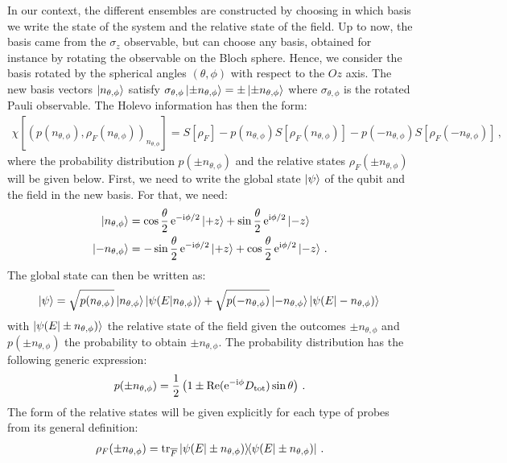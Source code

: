 In our context, the different ensembles are constructed by choosing 
in which basis we write the state of the system and the relative state
of the field. Up to now, the basis came from the
$\sigma_z$ observable, but can choose any basis, obtained for
instance by rotating the observable on the Bloch sphere. Hence,   
we consider the basis rotated by the spherical angles $(\theta,\phi)$ 
with respect to the $Oz$ axis. The new basis vectors
$\ket{n_{\theta,\phi}}$ satisfy $\sigma_{\theta,\phi} \ket{\pm 
n_{\theta,\phi}} =  \pm \ket{\pm n_{\theta,\phi}}$ where 
$\sigma_{\theta,\phi}$ is the rotated Pauli observable. The Holevo information
has then the form:
%
\begin{align}
\chi\left[ \left(p(n_{\theta,\phi}), \rho_F(n_{\theta,\phi}) \right)_{n_{\theta,\phi}} \right] 
= S[\rho_F] - p(n_{\theta,\phi})S[\rho_F(n_{\theta,\phi})] 
	- p(-n_{\theta,\phi})S[\rho_F(-n_{\theta,\phi})]
\,,
\end{align}
where the probability distribution $p(\pm n_{\theta,\phi})$ and the
relative states $\rho_F(\pm n_{\theta,\phi})$ will be given below. First, 
we need to write the global state $\ket{\psi}$ of the qubit and the field 
in the new basis. For that, we need:
%
\begin{subequations}
\begin{align}
\ket{n_{\theta,\phi}} &= \cos\frac{\theta}{2} \, \mathrm{e}^{-\mathrm{i} \phi/2} \ket{+z} + 
	\sin\frac{\theta}{2} \, \mathrm{e}^{\mathrm{i} \phi/2} \ket{-z}
\, \\
\ket{-n_{\theta,\phi}} &= -\sin\frac{\theta}{2}  \, \mathrm{e}^{-\mathrm{i} \phi/2} \ket{+z} + 
	\cos\frac{\theta}{2}  \, \mathrm{e}^{\mathrm{i} \phi/2} \ket{-z}
\,.
\end{align}
\end{subequations}
The global state can then be written as:
%
\begin{align}
\ket{\psi} = 
	\sqrt{p(n_{\theta,\phi})} \ket{n_{\theta,\phi}}\ket{\psi(E|n_{\theta,\phi})} +
	\sqrt{p(-n_{\theta,\phi})} \ket{-n_{\theta,\phi}}\ket{\psi(E|-n_{\theta,\phi})}
\,
\end{align}
with $\ket{\psi(E|\pm n_{\theta,\phi})}$ the relative state of the
field given the outcomes $\pm n_{\theta,\phi}$ and $p(\pm n_{\theta,\phi})$
the probability to obtain $\pm n_{\theta,\phi}$. The probability
distribution has the following generic expression:
%
\begin{align}
p(\pm n_{\theta,\phi}) = \frac{1}{2}
	\left( 1 \pm  
	\text{Re}(\mathrm{e}^{-\mathrm{i}\phi} D_{\text{tot}}) \sin\theta
	\right)
\,.
\end{align}
The form of the relative states will be given explicitly for each type of probes
from its general definition:
%
\begin{align}
\rho_F(\pm n_{\theta,\phi}) = \trace_{\overline{F}} 
	\ketbra{\psi(E|\pm n_{\theta,\phi})}
\,.
\end{align}

